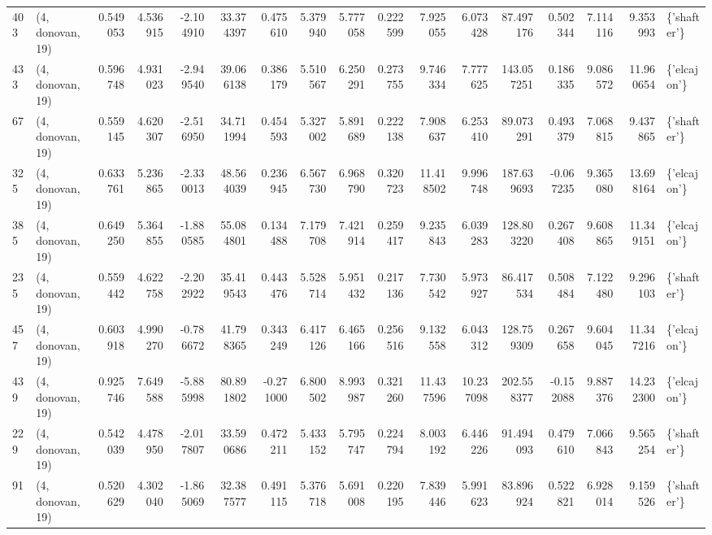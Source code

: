 \begin{tabular}{llrrrrrrrrrrrrrrl}
403 &  (4, donovan, 19) &   0.549053 &   4.536915 &  -2.104910 &    33.374397 &   0.475610 &   5.379940 &   5.777058 &  0.222599 &   7.925055 &   6.073428 &    87.497176 &   0.502344 &   7.114116 &   9.353993 &  \{'shafter'\} \\
433 &  (4, donovan, 19) &   0.596748 &   4.931023 &  -2.949540 &    39.066138 &   0.386179 &   5.510567 &   6.250291 &  0.273755 &   9.746334 &   7.777625 &   143.057251 &   0.186335 &   9.086572 &  11.960654 &  \{'elcajon'\} \\
67  &  (4, donovan, 19) &   0.559145 &   4.620307 &  -2.516950 &    34.711994 &   0.454593 &   5.327002 &   5.891689 &  0.222138 &   7.908637 &   6.253410 &    89.073291 &   0.493379 &   7.068815 &   9.437865 &  \{'shafter'\} \\
325 &  (4, donovan, 19) &   0.633761 &   5.236865 &  -2.330013 &    48.564039 &   0.236945 &   6.567730 &   6.968790 &  0.320723 &  11.418502 &   9.996748 &   187.639693 &  -0.067235 &   9.365080 &  13.698164 &  \{'elcajon'\} \\
385 &  (4, donovan, 19) &   0.649250 &   5.364855 &  -1.880585 &    55.084801 &   0.134488 &   7.179708 &   7.421914 &  0.259417 &   9.235843 &   6.039283 &   128.803220 &   0.267408 &   9.608865 &  11.349151 &  \{'elcajon'\} \\
235 &  (4, donovan, 19) &   0.559442 &   4.622758 &  -2.202922 &    35.419543 &   0.443476 &   5.528714 &   5.951432 &  0.217136 &   7.730542 &   5.973927 &    86.417534 &   0.508484 &   7.122480 &   9.296103 &  \{'shafter'\} \\
457 &  (4, donovan, 19) &   0.603918 &   4.990270 &  -0.786672 &    41.798365 &   0.343249 &   6.417126 &   6.465166 &  0.256516 &   9.132558 &   6.043312 &   128.759309 &   0.267658 &   9.604045 &  11.347216 &  \{'elcajon'\} \\
439 &  (4, donovan, 19) &   0.925746 &   7.649588 &  -5.885998 &    80.891802 &  -0.271000 &   6.800502 &   8.993987 &  0.321260 &  11.437596 &  10.237098 &   202.558377 &  -0.152088 &   9.887376 &  14.232300 &  \{'elcajon'\} \\
229 &  (4, donovan, 19) &   0.542039 &   4.478950 &  -2.017807 &    33.590686 &   0.472211 &   5.433152 &   5.795747 &  0.224794 &   8.003192 &   6.446226 &    91.494093 &   0.479610 &   7.066843 &   9.565254 &  \{'shafter'\} \\
91  &  (4, donovan, 19) &   0.520629 &   4.302040 &  -1.865069 &    32.387577 &   0.491115 &   5.376718 &   5.691008 &  0.220195 &   7.839446 &   5.991623 &    83.896924 &   0.522821 &   6.928014 &   9.159526 &  \{'shafter'\} \\

\end{tabular}
